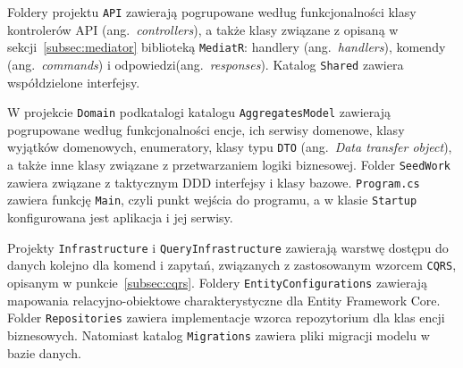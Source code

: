 Foldery projektu \texttt{API} zawierają pogrupowane według funkcjonalności klasy kontrolerów API (ang.~\emph{controllers}), a także klasy związane z opisaną w sekcji~\ref{subsec:mediator} biblioteką \texttt{MediatR}: handlery (ang.~\emph{handlers}), komendy (ang.~\emph{commands}) i odpowiedzi(ang.~\emph{responses}). Katalog \texttt{Shared} zawiera współdzielone interfejsy. 

W projekcie \texttt{Domain} podkatalogi katalogu \texttt{AggregatesModel} zawierają pogrupowane według funkcjonalności encje, ich serwisy domenowe, klasy wyjątków domenowych, enumeratory, klasy typu \texttt{DTO} (ang.~\emph{Data transfer object}), a także inne klasy związane z przetwarzaniem logiki biznesowej. Folder \texttt{SeedWork} zawiera związane z taktycznym DDD interfejsy i klasy bazowe. \texttt{Program.cs} zawiera funkcję \texttt{Main}, czyli punkt wejścia do programu, a w klasie \texttt{Startup} konfigurowana jest aplikacja i jej serwisy.

Projekty \texttt{Infrastructure} i \texttt{QueryInfrastructure} zawierają warstwę dostępu do danych kolejno dla komend i zapytań, związanych z zastosowanym wzorcem \texttt{CQRS}, opisanym w punkcie~\ref{subsec:cqrs}. Foldery \texttt{EntityConfigurations} zawierają mapowania relacyjno-obiektowe charakterystyczne dla Entity Framework Core. Folder \texttt{Repositories} zawiera implementacje wzorca repozytorium dla klas encji biznesowych. Natomiast katalog \texttt{Migrations} zawiera pliki migracji modelu w bazie danych.


